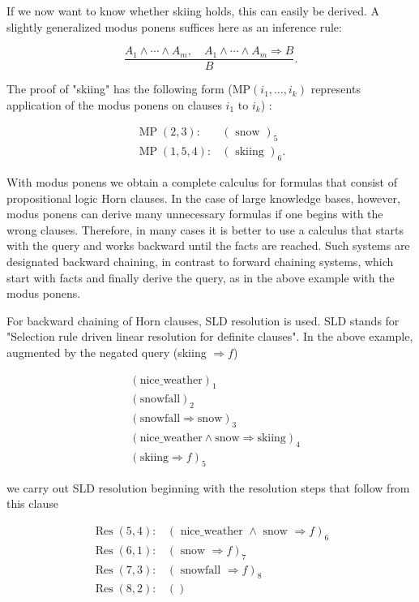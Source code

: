 \documentclass[10pt]{book}
\begin{document}
If we now want to know whether skiing holds, this can easily be derived. A slightly generalized modus ponens suffices here as an inference rule:

$$
\frac{A_{1} \wedge \cdots \wedge A_{m}, \quad A_{1} \wedge \cdots \wedge A_{m} \Rightarrow B}{B} .
$$

The proof of "skiing" has the following form ($\mathrm{MP}\left(i_{1}, \ldots, i_{k}\right)$ represents application of the modus ponens on clauses $i_{1}$ to $i_{k}$) :

$$
\begin{array}{ll}
\operatorname{MP}(2,3): & (\text { snow })_{5} \\
\operatorname{MP}(1,5,4): & (\text { skiing })_{6} .
\end{array}
$$

With modus ponens we obtain a complete calculus for formulas that consist of propositional logic Horn clauses. In the case of large knowledge bases, however, modus ponens can derive many unnecessary formulas if one begins with the wrong clauses. Therefore, in many cases it is better to use a calculus that starts with the query and works backward until the facts are reached. Such systems are designated backward chaining, in contrast to forward chaining systems, which start with facts and finally derive the query, as in the above example with the modus ponens.

For backward chaining of Horn clauses, SLD resolution is used. SLD stands for "Selection rule driven linear resolution for definite clauses". In the above example, augmented by the negated query (skiing $\Rightarrow f$)

\[
\begin{aligned}
&(\text{nice\_weather})_{1}\\
&(\text{snowfall})_{2}\\
&(\text{snowfall} \Rightarrow \text{snow})_{3}\\
&(\text{nice\_weather} \wedge \text{snow} \Rightarrow \text{skiing})_{4}\\
&(\text{skiing} \Rightarrow f)_{5}
\end{aligned}
\]

we carry out SLD resolution beginning with the resolution steps that follow from this clause

$$
\begin{array}{ll}
\operatorname{Res}(5,4): & (\text { nice\_weather } \wedge \text { snow } \Rightarrow f)_{6} \\
\operatorname{Res}(6,1): & (\text { snow } \Rightarrow f)_{7} \\
\operatorname{Res}(7,3): & (\text { snowfall } \Rightarrow f)_{8} \\
\operatorname{Res}(8,2): & ()
\end{array}
$$
\end{document}
